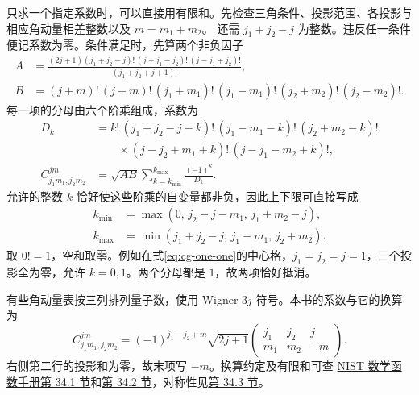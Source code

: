 只求一个指定系数时，可以直接用有限和。先检查三角条件、投影范围、各投影与相应角动量相差整数以及 $m = m_1 + m_2$。
还需 $j_1 + j_2 - j$ 为整数。违反任一条件便记系数为零。条件满足时，先算两个非负因子
\begin{equation}
    \begin{alignedat}{1}
        A &= \frac{(2j + 1)(j_1 + j_2 - j)!\,(j + j_1 - j_2)!\,(j - j_1 + j_2)!}{(j_1 + j_2 + j + 1)!},\\
        B &= (j + m)!\,(j - m)!\,(j_1 + m_1)!\,(j_1 - m_1)!\,(j_2 + m_2)!\,(j_2 - m_2)! .
    \end{alignedat}
\end{equation}
每一项的分母由六个阶乘组成，系数为
\begin{equation}
    \begin{alignedat}{1}
        D_k &= k!\,(j_1 + j_2 - j - k)!\,(j_1 - m_1 - k)!\,(j_2 + m_2 - k)!\\
           &\qquad{} \times (j - j_2 + m_1 + k)!\,(j - j_1 - m_2 + k)!,\\
        C^{jm}_{j_1m_1,j_2m_2} &= \sqrt{AB}\sum_{k=k_{\min}}^{k_{\max}}\frac{(-1)^k}{D_k}.
    \end{alignedat}
\end{equation}
允许的整数 $k$ 恰好使这些阶乘的自变量都非负，因此上下限可直接写成
\begin{equation}
    \begin{alignedat}{1}
        k_{\min} &= \max(0,\,j_2 - j - m_1,\,j_1 + m_2 - j),\\
        k_{\max} &= \min(j_1 + j_2 - j,\,j_1 - m_1,\,j_2 + m_2).
    \end{alignedat}
\end{equation}
取 $0! = 1$，空和取零。例如在式\eqref{eq:cg-one-one}的中心格，$j_1 = j_2 = j = 1$，三个投影全为零，允许 $k = 0,1$。两个分母都是 $1$，故两项恰好抵消。

有些角动量表按三列排列量子数，使用 Wigner $3j$ 符号。本书的系数与它的换算为
\begin{equation}
    C^{jm}_{j_1m_1,j_2m_2}
      = (-1)^{j_1-j_2+m}\sqrt{2j + 1}
       \begin{pmatrix} j_1 & j_2 & j \\ m_1 & m_2 & -m \end{pmatrix}.
\end{equation}
右侧第二行的投影和为零，故末项写 $-m$。换算约定及有限和可查
\href{https://dlmf.nist.gov/34.1}{NIST 数学函数手册第 34.1 节}和\href{https://dlmf.nist.gov/34.2}{第 34.2 节}，对称性见\href{https://dlmf.nist.gov/34.3}{第 34.3 节}。
